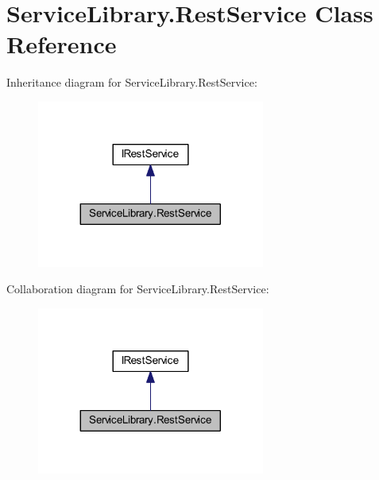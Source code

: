 \hypertarget{class_service_library_1_1_rest_service}{\section{Service\-Library.\-Rest\-Service Class Reference}
\label{class_service_library_1_1_rest_service}
}


Inheritance diagram for Service\-Library.\-Rest\-Service\-:\nopagebreak
\begin{figure}[H]
\begin{center}
\leavevmode
\includegraphics[width=212pt]{class_service_library_1_1_rest_service__inherit__graph}
\end{center}
\end{figure}


Collaboration diagram for Service\-Library.\-Rest\-Service\-:\nopagebreak
\begin{figure}[H]
\begin{center}
\leavevmode
\includegraphics[width=212pt]{class_service_library_1_1_rest_service__coll__graph}
\end{center}
\end{figure}
